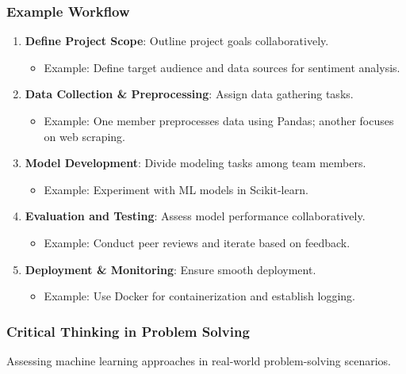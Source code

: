\documentclass[aspectratio=169]{beamer}
\begin{document}
\begin{frame}[fragile]
    \frametitle{Example Workflow}
    \begin{enumerate}
        \item \textbf{Define Project Scope}: Outline project goals collaboratively.
        \begin{itemize}
            \item Example: Define target audience and data sources for sentiment analysis.
        \end{itemize}
        
        \item \textbf{Data Collection \& Preprocessing}: Assign data gathering tasks.
        \begin{itemize}
            \item Example: One member preprocesses data using Pandas; another focuses on web scraping.
        \end{itemize}
        
        \item \textbf{Model Development}: Divide modeling tasks among team members.
        \begin{itemize}
            \item Example: Experiment with ML models in Scikit-learn.
        \end{itemize}
        
        \item \textbf{Evaluation and Testing}: Assess model performance collaboratively.
        \begin{itemize}
            \item Example: Conduct peer reviews and iterate based on feedback.
        \end{itemize}
        
        \item \textbf{Deployment \& Monitoring}: Ensure smooth deployment.
        \begin{itemize}
            \item Example: Use Docker for containerization and establish logging.
        \end{itemize}
    \end{enumerate}
\end{frame}

\begin{frame}[fragile]
    \frametitle{Critical Thinking in Problem Solving}
    Assessing machine learning approaches in real-world problem-solving scenarios.
\end{frame}
\end{document}
